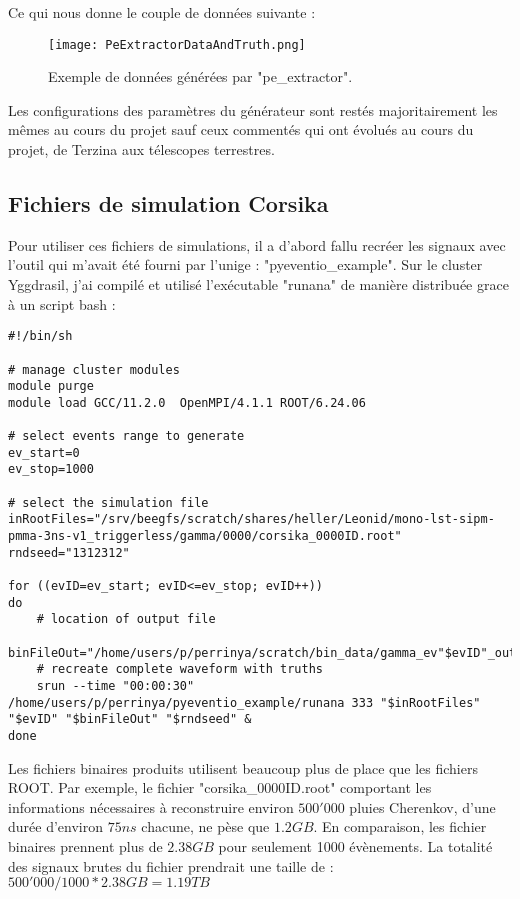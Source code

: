 Ce qui nous donne le couple de données suivante :

\begin{figure}[tbph!]
	\centering
	\texttt{[image: PeExtractorDataAndTruth.png]}
	\caption[Exemple de données générées par "pe\_extractor"]{Exemple de données générées par "pe\_extractor".}
\end{figure}

Les configurations des paramètres du générateur sont restés majoritairement les mêmes au cours du projet 
sauf ceux commentés qui ont évolués au cours du projet, de Terzina aux télescopes terrestres.

\subsection{Fichiers de simulation Corsika}

Pour utiliser ces fichiers de simulations, il a d'abord fallu recréer les signaux avec l'outil qui m'avait été fourni par l'\gls{unige} : "pyeventio\_example".
Sur le cluster Yggdrasil, j'ai compilé et utilisé l'exécutable "runana" de manière distribuée grace à un script bash :

\begin{lstlisting}[language=iBash,caption={Script de génération des signaux à partir de fichier de simulation, data/slurm-run.sh},captionpos=b]
#!/bin/sh

# manage cluster modules
module purge
module load GCC/11.2.0  OpenMPI/4.1.1 ROOT/6.24.06

# select events range to generate
ev_start=0
ev_stop=1000

# select the simulation file
inRootFiles="/srv/beegfs/scratch/shares/heller/Leonid/mono-lst-sipm-pmma-3ns-v1_triggerless/gamma/0000/corsika_0000ID.root"
rndseed="1312312"

for ((evID=ev_start; evID<=ev_stop; evID++))
do
	# location of output file
	binFileOut="/home/users/p/perrinya/scratch/bin_data/gamma_ev"$evID"_out.bin"
	# recreate complete waveform with truths
	srun --time "00:00:30" /home/users/p/perrinya/pyeventio_example/runana 333 "$inRootFiles" "$evID" "$binFileOut" "$rndseed" &
done
\end{lstlisting}

Les fichiers binaires produits utilisent beaucoup plus de place que les fichiers ROOT. Par exemple, le fichier "corsika\_0000ID.root" comportant les
informations nécessaires à reconstruire environ $500'000$ pluies Cherenkov, d'une durée d'environ $75ns$ chacune, ne pèse que $1.2GB$.
En comparaison, les fichier binaires prennent plus de $2.38GB$ pour seulement 1000 évènements. 
La totalité des signaux brutes du fichier prendrait une taille de : $500'000/1000 * 2.38GB = 1.19TB$

